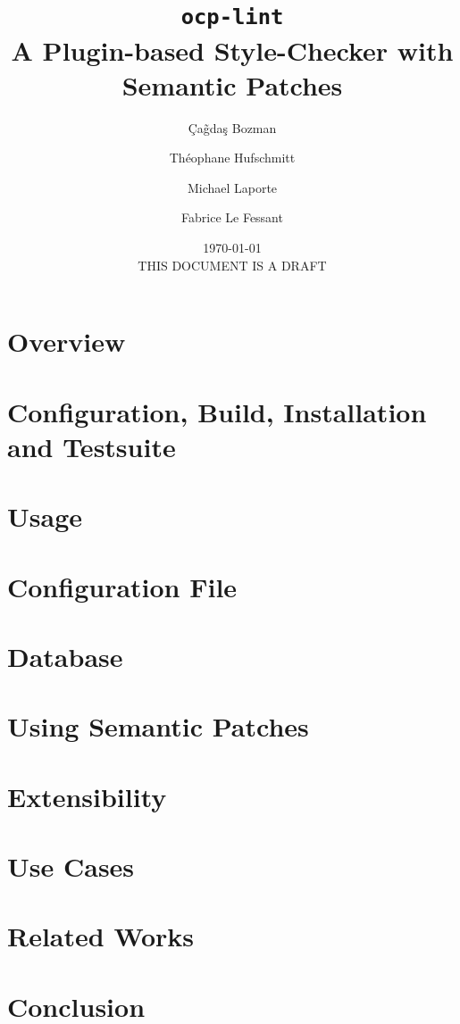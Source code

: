 \documentclass[a4paper,11pt]{article}
\title{{\bf {\tt ocp-lint}\\
 A Plugin-based Style-Checker with Semantic Patches}}
\author[1]{\c{C}a\~{g}da\c{s} Bozman}
\author[1]{Th\'eophane Hufschmitt}
\author[1]{Michael Laporte}
\author[1,2]{Fabrice Le Fessant}
\affil[1]{OCamlPro}
\affil[2]{INRIA}
\date{\today{}\\
THIS DOCUMENT IS A DRAFT}
\begin{document}
\def\ocplint{{\sf ocp-lint}}

\maketitle

\newpage

\tableofcontents

\newpage

\section{Overview}
\label{sec:overview}


\section{Configuration, Build, Installation and Testsuite}
\label{sec:config-build-install}


\section{Usage}
\label{sec:usage}


\section{Configuration File}
\label{sec:configuration}


\section{Database}
\label{sec:database}


\section{Using Semantic Patches}
\label{sec:sempatch}


\section{Extensibility}
\label{sec:extensibility}


\section{Use Cases}
\label{sec:use-cases}


\section{Related Works}
\label{sec:related}


\section{Conclusion}
\label{sec:conclusion}



 
\end{document}
